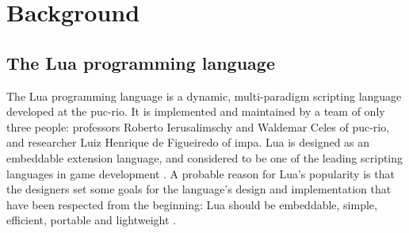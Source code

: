 \chapter{Background}
\label{chp:background}

\section{The Lua programming language}
\label{sec:lua_language}
The Lua programming language is a dynamic, multi-paradigm scripting language developed at the \gls{puc-rio}. It is implemented and maintained by a team of only three people: professors Roberto Ierusalimschy and Waldemar Celes of \gls{puc-rio}, and researcher Luiz Henrique de Figueiredo of \gls{impa}. Lua is designed as an embeddable extension language, and considered to be one of the leading scripting languages in game development \cite{inproceedings:the_evolution_of_lua}. A probable reason for Lua’s popularity is that the designers set some goals for the language’s design and implementation that have been respected from the beginning: Lua should be embeddable, simple, efficient, portable and lightweight \cite{article:the_implementation_of_lua}.

